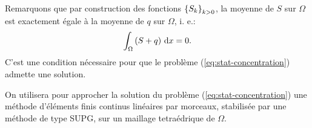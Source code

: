 Remarquons que par construction des fonctions $\left\{ S_k \right\}_{k>0}$, la moyenne de $S$ sur
$\Omega$ est exactement égale à la moyenne de $q$ sur
$\Omega$, i. e.:
\begin{equation}
  \int_\Omega \left( S + q \right)\,\mathrm dx = 0.
\end{equation}
C'est une condition nécessaire pour que le problème
(\ref{eq:stat-concentration}) admette une solution.

  On utilisera pour approcher la solution du problème
(\ref{eq:stat-concentration}) une méthode d'éléments finis continus
linéaires par morceaux, stabilisée par une méthode de type SUPG, sur un
maillage tetraédrique de $\Omega$.
